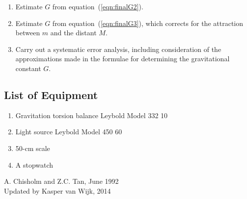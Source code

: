 \documentclass{article}
\begin{document}
\begin{enumerate}[resume]
\item Estimate $G$ from equation~(\ref{eqn:finalG2}).

\item Estimate $G$ from equation~(\ref{eqn:finalG3}), which corrects for
  the attraction between $m$ and the distant $M$.
  
\item Carry out a systematic error analysis, including consideration
  of the approximations made in the formulae for determining the
  gravitational constant $G$.
\end{enumerate}%

\subsection*{List of Equipment}%


\begin{enumerate}
\item  Gravitation torsion balance Leybold Model 332 10
\item  Light source Leybold Model 450 60
\item 50-cm scale
\item A stopwatch
\end{enumerate}

\noindent A. Chisholm and Z.C. Tan, June 1992\\
Updated by Kasper van Wijk, 2014
\end{document}
